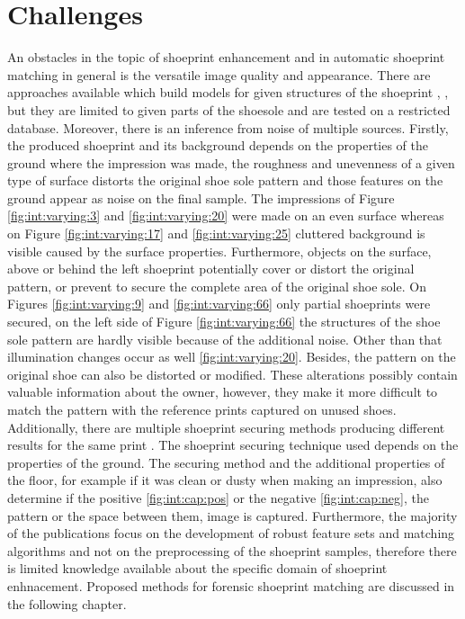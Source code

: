 \documentclass[draft,final]{vutinfth} %
\begin{document}
\section{Challenges}
\par
An obstacles in the topic of shoeprint enhancement and in automatic shoeprint matching in general is the versatile image quality and appearance.
There are approaches available which build models for given structures of the shoeprint \cite{tang2010footwear}, \cite{alizadeh2017automatic}, but they are limited to given parts of the shoesole and are tested on a restricted database.
Moreover, there is an inference from noise of multiple sources.
Firstly, the produced shoeprint and its background depends on the properties of the ground where the impression was made, the roughness and unevenness of a given type of surface distorts the original shoe sole pattern and those features on the ground appear as noise on the final sample.
The impressions of Figure \ref{fig:int:varying:3} and \ref{fig:int:varying:20} were made on an even surface whereas on Figure \ref{fig:int:varying:17} and \ref{fig:int:varying:25} cluttered background is visible caused by the surface properties.
Furthermore, objects on the surface, above or behind the left shoeprint potentially cover or distort the original pattern, or prevent to secure the complete area of the original shoe sole.
On Figures \ref{fig:int:varying:9} and \ref{fig:int:varying:66} only partial shoeprints were secured, on the left side of Figure \ref{fig:int:varying:66} the structures of the shoe sole pattern are hardly visible because of the additional noise.
Other than that illumination changes occur as well \ref{fig:int:varying:20}.
Besides, the pattern on the original shoe can also be distorted or modified.
These alterations possibly contain valuable information about the owner, however, they make it more difficult to match the pattern with the reference prints captured on unused shoes.
Additionally, there are multiple shoeprint securing methods producing different results for the same print \cite{katireddy2017novel}. 
The shoeprint securing technique used depends on the properties of the ground. 
The securing method and the additional properties of the floor, for example if it was clean or dusty when making an impression, also determine if the positive \ref{fig:int:cap:pos} or the negative \ref{fig:int:cap:neg}, the pattern or the space between them, image is captured.
Furthermore, the majority of the publications focus on the development of robust feature sets and matching algorithms and not on the preprocessing of the shoeprint samples, therefore there  is limited knowledge available about the specific domain of shoeprint enhnacement.
Proposed methods for forensic shoeprint matching are discussed in the following chapter.
\end{document}
